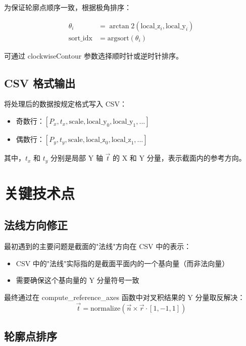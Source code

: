 \documentclass[12pt,a4paper]{article}
\begin{document}
为保证轮廓点顺序一致，根据极角排序：

\begin{align}
\theta_i &= \arctan2(\text{local\_z}_i, \text{local\_y}_i) \\
\text{sort\_idx} &= \text{argsort}(\theta_i)
\end{align}

可通过 clockwiseContour 参数选择顺时针或逆时针排序。

\subsection{CSV 格式输出}

将处理后的数据按规定格式写入 CSV：

\begin{itemize}
  \item 奇数行：$[P_x, t_x, \text{scale}, \text{local\_y}_0, \text{local\_y}_1, ...]$
  \item 偶数行：$[P_y, t_y, \text{scale}, \text{local\_z}_0, \text{local\_z}_1, ...]$
\end{itemize}

其中，$t_x$ 和 $t_y$ 分别是局部 Y 轴 $\vec{t}$ 的 X 和 Y 分量，表示截面内的参考方向。

\section{关键技术点}

\subsection{法线方向修正}

最初遇到的主要问题是截面的"法线"方向在 CSV 中的表示：
\begin{itemize}
  \item CSV 中的"法线"实际指的是截面平面内的一个基向量（而非法向量）
  \item 需要确保这个基向量的 Y 分量符号一致
\end{itemize}

最终通过在 compute\_reference\_axes 函数中对叉积结果的 Y 分量取反解决：
\begin{equation}
\vec{t} = \text{normalize}(\vec{n} \times \vec{r} \cdot [1, -1, 1])
\end{equation}

\subsection{轮廓点排序}
\end{document}
